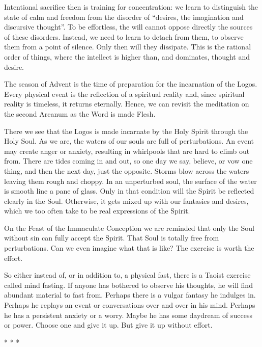 Intentional sacrifice then is training for concentration: we learn to distinguish the state of calm and freedom from the disorder of “desires, the imagination and discursive thought”. To be effortless, the will cannot oppose directly the sources of these disorders. Instead, we need to learn to detach from them, to observe them from a point of silence. Only then will they dissipate. This is the rational order of things, where the intellect is higher than, and dominates, thought and desire.

The season of Advent is the time of preparation for the incarnation of the Logos. Every physical event is the reflection of a spiritual reality and, since spiritual reality is timeless, it returns eternally. Hence, we can revisit the meditation on the second Arcanum as the Word is made Flesh.

There we see that the Logos is made incarnate by the Holy Spirit through the Holy Soul. As we are, the waters of our souls are full of perturbations. An event may create anger or anxiety, resulting in whirlpools that are hard to climb out from. There are tides coming in and out, so one day we say, believe, or vow one thing, and then the next day, just the opposite. Storms blow across the waters leaving them rough and choppy. In an unperturbed soul, the surface of the water is smooth line a pane of glass. Only in that condition will the Spirit be reflected clearly in the Soul. Otherwise, it gets mixed up with our fantasies and desires, which we too often take to be real expressions of the Spirit.

On the Feast of the Immaculate Conception we are reminded that only the Soul without sin can fully accept the Spirit. That Soul is totally free from perturbations. Can we even imagine what that is like? The exercise is worth the effort.

So either instead of, or in addition to, a physical fast, there is a Taoist exercise called mind fasting. If anyone has bothered to observe his thoughts, he will find abundant material to fast from. Perhaps there is a vulgar fantasy he indulges in. Perhaps he replays an event or conversations over and over in his mind. Perhaps he has a persistent anxiety or a worry. Maybe he has some daydream of success or power. Choose one and give it up. But give it up without effort.




\begin{center}* * *\end{center}

